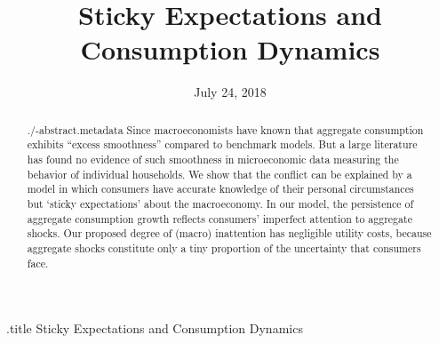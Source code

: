 \documentclass[titlepage]{\econtex}\newcommand{\texname}{cAndCwithStickyE}
\begin{document}




\begin{verbatimwrite}{\jobname.title}
Sticky Expectations and Consumption Dynamics
\end{verbatimwrite}

\hfill{\tiny \jobname}

\title{Sticky Expectations and \\ Consumption Dynamics}




\date{July 24, 2018}
\maketitle

\begin{abstract}
  \begin{verbatimwrite}{./\jobname-abstract.metadata}
    Since \cite{cdSmooth} macroeconomists have known that aggregate consumption exhibits ``excess smoothness'' compared to benchmark models.  But a large literature has found no evidence of such smoothness in microeconomic data measuring the behavior of individual households.  We show that the conflict can be explained by a model in which consumers have accurate knowledge of their personal circumstances but `sticky expectations' about the macroeconomy. In our model, the persistence of aggregate consumption growth reflects consumers' imperfect attention to aggregate shocks. Our proposed degree of (macro) inattention has negligible utility costs, because aggregate shocks constitute only a tiny proportion of the uncertainty that consumers face.  %
  \end{verbatimwrite}
  
\end{abstract}
\end{document}
